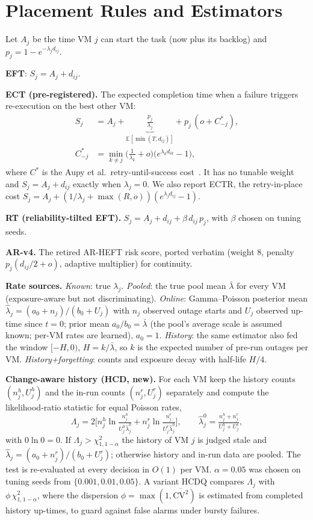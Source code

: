 \documentclass[10pt,twocolumn,letterpaper]{article}
\begin{document}
\section{Placement Rules and Estimators}
Let $A_j$ be the time VM $j$ can start the task (now plus its backlog) and $p_j = 1 - e^{-\lambda_j d_{ij}}$.

\textbf{EFT}: $S_j = A_j + d_{ij}$.

\textbf{ECT (pre-registered).} The expected completion time when a failure triggers re-execution on the best
other VM:
\begin{align}
S_j &= A_j + \underbrace{\tfrac{p_j}{\lambda_j}}_{\mathbb{E}[\min(T,d_{ij})]} + p_j\,(o + C^*_{-j}),\\
C^*_{-j} &= \min_{k\neq j}\Big(\tfrac{1}{\lambda_k}+o\Big)\big(e^{\lambda_k d_{ik}}-1\big),
\end{align}
where $C^*$ is the Aupy et al.\ retry-until-success cost~\cite{aupy2016checkpointing}. It has no tunable weight and
$S_j = A_j + d_{ij}$ exactly when $\lambda_j = 0$. We also report \textsf{ECTR}, the retry-in-place cost
$S_j = A_j + (1/\lambda_j + \max(R,o))(e^{\lambda_j d_{ij}}-1)$.

\textbf{RT (reliability-tilted EFT).} $S_j = A_j + d_{ij} + \beta\, d_{ij}\, p_j$, with $\beta$ chosen on tuning seeds.

\textbf{AR-v4.} The retired AR-HEFT risk score, ported verbatim (weight 8, penalty $p_j(d_{ij}/2+o)$, adaptive
multiplier) for continuity.

\textbf{Rate sources.} \emph{Known}: true $\lambda_j$. \emph{Pooled}: the true pool mean $\bar\lambda$ for every VM
(exposure-aware but not discriminating). \emph{Online}: Gamma--Poisson posterior mean
$\hat\lambda_j = (a_0+n_j)/(b_0+U_j)$ with $n_j$ observed outage starts and $U_j$ observed up-time since $t=0$;
prior mean $a_0/b_0 = \bar\lambda$ (the pool's average scale is assumed known; per-VM rates are learned),
$a_0 = 1$. \emph{History}: the same estimator also fed the window $[-H,0)$, $H = k/\bar\lambda$, so $k$ is the
expected number of pre-run outages per VM. \emph{History+forgetting}: counts and exposure decay with half-life $H/4$.

\textbf{Change-aware history (\textsf{HCD}, new).} For each VM keep the history counts $(n^h_j,U^h_j)$ and the
in-run counts $(n^r_j,U^r_j)$ separately and compute the likelihood-ratio statistic for equal Poisson rates,
\begin{equation}
\Lambda_j = 2\Big[n^h_j\ln\tfrac{n^h_j}{U^h_j\hat\lambda^0_j} + n^r_j\ln\tfrac{n^r_j}{U^r_j\hat\lambda^0_j}\Big],\qquad
\hat\lambda^0_j=\tfrac{n^h_j+n^r_j}{U^h_j+U^r_j},
\end{equation}
with $0\ln 0=0$. If $\Lambda_j>\chi^2_{1,1-\alpha}$ the history of VM $j$ is judged stale and
$\hat\lambda_j=(a_0+n^r_j)/(b_0+U^r_j)$; otherwise history and in-run data are pooled. The test is
re-evaluated at every decision in $O(1)$ per VM. $\alpha=0.05$ was chosen on tuning seeds from
$\{0.001,0.01,0.05\}$. A variant \textsf{HCDQ} compares $\Lambda_j$ with $\phi\,\chi^2_{1,1-\alpha}$, where the
dispersion $\phi=\max(1,\overline{\mathrm{CV}^2})$ is estimated from completed history up-times, to guard against
false alarms under bursty failures.
\end{document}
